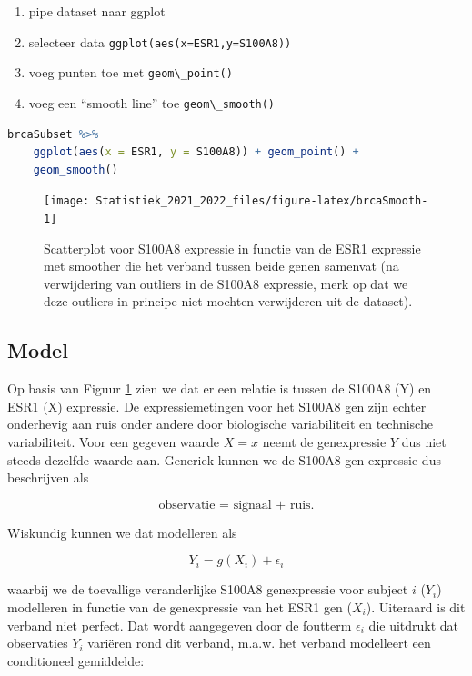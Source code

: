 \documentclass[
  12pt,dutch,coursenotes]{book}
\newcommand{\passthrough}[1]{#1}
\providecommand{\tightlist}{%
  \setlength{\itemsep}{0pt}\setlength{\parskip}{0pt}}
\theoremstyle{definition}
\theoremstyle{definition}
\theoremstyle{definition}
\theoremstyle{definition}
\theoremstyle{remark}
\begin{document}
\begin{enumerate}
\def\labelenumi{\arabic{enumi}.}
\tightlist
\item
  pipe dataset naar ggplot
\item
  selecteer data \passthrough{\lstinline!ggplot(aes(x=ESR1,y=S100A8))!}
\item
  voeg punten toe met \passthrough{\lstinline!geom\_point()!}
\item
  voeg een ``smooth line'' toe \passthrough{\lstinline!geom\_smooth()!}
\end{enumerate}

\begin{lstlisting}[language=R]
brcaSubset %>%
    ggplot(aes(x = ESR1, y = S100A8)) + geom_point() +
    geom_smooth()
\end{lstlisting}

\begin{figure}

{\centering \texttt{[image: Statistiek\_2021\_2022\_files/figure-latex/brcaSmooth-1]} 

}

\caption{Scatterplot voor S100A8 expressie in functie van de ESR1 expressie met smoother die het verband tussen beide genen samenvat (na verwijdering van outliers in de S100A8 expressie, merk op dat we deze outliers in principe niet mochten verwijderen uit de dataset).}\label{fig:brcaSmooth}
\end{figure}

\hypertarget{model}{%
\subsection{Model}\label{model}}

Op basis van Figuur \ref{fig:brcaSmooth} zien we dat er een relatie is tussen de S100A8 (Y) en ESR1 (X) expressie.
De expressiemetingen voor het S100A8 gen zijn echter onderhevig aan ruis onder andere door biologische variabiliteit en technische variabiliteit.
Voor een gegeven waarde \(X=x\) neemt de genexpressie \(Y\) dus niet steeds dezelfde waarde aan.
Generiek kunnen we de S100A8 gen expressie dus beschrijven als

\[\text{observatie = signaal + ruis.}\]

Wiskundig kunnen we dat modelleren als

\[Y_i=g(X_i)+\epsilon_i\]

waarbij we de toevallige veranderlijke S100A8 genexpressie voor subject \(i\) (\(Y_i\)) modelleren in functie van de genexpressie van het ESR1 gen (\(X_i\)). Uiteraard is dit verband niet perfect. Dat wordt aangegeven door de foutterm \(\epsilon_i\) die uitdrukt dat observaties \(Y_i\) variëren rond dit verband, m.a.w.
het verband modelleert een conditioneel gemiddelde:
\end{document}

